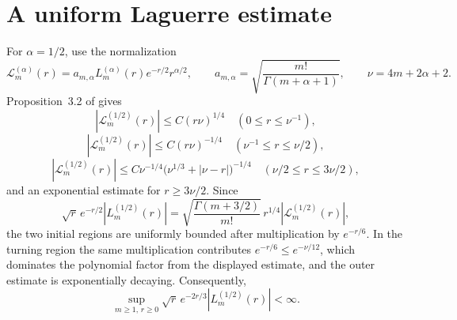 \section{A uniform Laguerre estimate}\label{app:laguerre}

For $\alpha=1/2$, use the normalization
\[
\mathcal L_m^{(\alpha)}(r)
 =a_{m,\alpha}L_m^{(\alpha)}(r)e^{-r/2}r^{\alpha/2},
\qquad
a_{m,\alpha}=\sqrt{\frac{m!}{\Gamma(m+\alpha+1)}},
\qquad
\nu=4m+2\alpha+2.
\]
Proposition~3.2 of \cite{ImekrazRobertThomann2016} gives
\[
|\mathcal L_m^{(1/2)}(r)|\le C(r\nu)^{1/4}\quad (0\le r\le\nu^{-1}),
\]
\[
|\mathcal L_m^{(1/2)}(r)|\le C(r\nu)^{-1/4}\quad (\nu^{-1}\le r\le\nu/2),
\]
\[
|\mathcal L_m^{(1/2)}(r)|
 \le C\nu^{-1/4}\bigl(\nu^{1/3}+|\nu-r|\bigr)^{-1/4}
 \quad (\nu/2\le r\le3\nu/2),
\]
and an exponential estimate for $r\ge3\nu/2$. Since
\[
\sqrt r\,e^{-r/2}|L_m^{(1/2)}(r)|
 =\sqrt{\frac{\Gamma(m+3/2)}{m!}}\,r^{1/4}|\mathcal L_m^{(1/2)}(r)|,
\]
the two initial regions are uniformly bounded after multiplication by $e^{-r/6}$. In the turning region the same multiplication contributes $e^{-r/6}\le e^{-\nu/12}$, which dominates the polynomial factor from the displayed estimate, and the outer estimate is exponentially decaying. Consequently,
\[
\sup_{m\ge1,\,r\ge0}\sqrt r\,e^{-2r/3}|L_m^{(1/2)}(r)|<\infty.
\]
